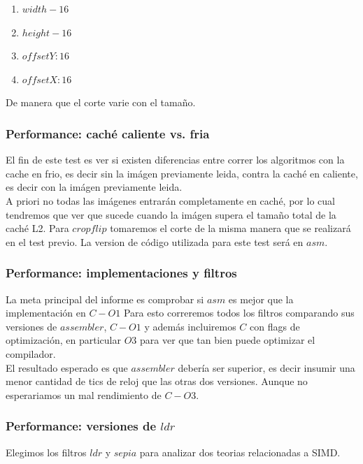 \begin{enumerate}
\item $width-16$ 
\item $height-16$
\item $offsetY: 16$
\item $offsetX: 16$
\end{enumerate}

De manera que el corte varie con el tamaño. 

\subsubsection{Performance: caché caliente vs. fria}

El fin de este test es ver si existen diferencias entre correr los algoritmos con la cache en frio, es decir sin la imágen previamente leida, contra la caché en caliente, es decir con la imágen previamente leida. \\
A priori no todas las imágenes entrarán completamente en caché, por lo cual tendremos que ver que sucede cuando la imágen supera el tamaño total de la caché L2. 
Para $cropflip$ tomaremos el corte de la misma manera que se realizará en el test previo.
La version de código utilizada para este test será en $asm$.

\subsubsection{Performance: implementaciones y filtros}

La meta principal del informe es comprobar si $asm$ es mejor que la implementación en $C-O1$
Para esto correremos todos los filtros comparando sus versiones de $assembler$, $C-O1$ y además incluiremos $C$ con flags de optimización, en particular $O3$ para ver que tan bien puede optimizar el compilador. \\

El resultado esperado es que $assembler$ debería ser superior, es decir insumir una menor cantidad de tics de reloj que las otras dos versiones. Aunque no esperariamos un mal rendimiento de $C-O3$. \\

\subsubsection{Performance: versiones de $ldr$}

Elegimos los filtros $ldr$ y $sepia$ para analizar dos teorias relacionadas a SIMD. 

